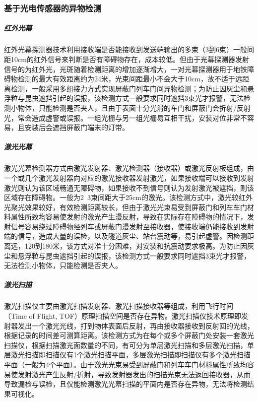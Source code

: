 \subsubsection*{基于光电传感器的异物检测}
\subparagraph*{\textbf{红外光幕}}
红外光幕探测器技术利用接收端是否能接收到发送端输出的多束（3到6束）一般间距10cm的红外信号来判断是否有障碍物存在，成本较低。但由于光幕探测器发射信号的为红外光，光斑随着检测距离的增加逐渐增大，一对光幕探测器用于地铁障碍物检测的最大有效距离约为24米，光束间距最小不会大于10cm，故不适于远距离检测，一般采用多组接力方式实现屏蔽门列车门间异物检测；为防止因灰尘和悬浮粒与昆虫遮挡引起的误报，该检测方式一般要求同时遮挡3束光才报警，无法检测小物体，只能检测是否夹人，且由于表面十分光滑的车门和屏蔽门会折射/反射光，常会造成虚警或误报。一组光栅与另一组光栅易互相干扰，安装对位非常不容易，且安装后会遮挡屏蔽门端末的灯带。
\subparagraph*{\textbf{激光光幕}}
激光光幕检测器方式由激光发射器、激光检测器（接收器）或激光反射板组成，由一个或几个激光发射器向对应的激光接收器发射激光，如果接收端可以接收到发射激光则认为该区域畅通无障碍物，如果接收不到信号则认为发射激光被遮挡，则该区域存在障碍物。一般为2~3束间距大于25cm的激光。该检测方式中，激光较红外光聚光效果较好，有效检测距离较长，但由于激光光束易受到屏蔽门和列车车门材料属性所致均容易使发射的激光产生漫反射，导致在实际存在障碍物的情况下，发射信号容易绕过障碍物经列车或屏蔽门漫发射至接收器，使接收端仍能接收到发射端的信号，造成大量的误检，以及隧道灰尘、站台震动等，易引起虚警。因检测距离远，120到180米，该方式对准十分困难，对安装和抗震动要求极高。为防止因灰尘和悬浮粒与昆虫遮挡引起的误报，该检测方式一般要求同时遮挡3束光\cite{金仙力2020一种用于站台门障碍物探测的传感器系统及其探测方法}才报警，无法检测小物体，只能检测是否夹人。
\subparagraph*{\textbf{激光扫描}}
激光扫描仪主要由激光扫描发射器、激光扫描接收器等组成，利用飞行时间\cite{黄照东2021一种基于激光视觉的智能地铁站台屏蔽门异物探测器}（Time of Flight, TOF）原理扫描空间是否存在异物。激光扫描仪技术原理即发射器发出一个激光光线，打到物体表面后反射，再由接收器接收到反射回的光线，根据记录的时间差可测算距离。该检测方式为在每个或多个屏蔽门处安装一套激光扫描仪，根据扫描激光面数量的不同，有可分为单层激光扫描和多层激光扫描，单层激光扫描即扫描仪有1个激光扫描平面，多层激光扫描即扫描仪有多个激光扫描平面（一般为4个平面）。由于激光光束易受到屏蔽门和列车车门材料属性所致均容易使发射激光产生反射/折射，导致发射器发出的扫描光束无法返回接收器，从而导致漏检与误检，且仅能检测激光光幕扫描的平面内是否存在异物，无法将检测结果可视化。
